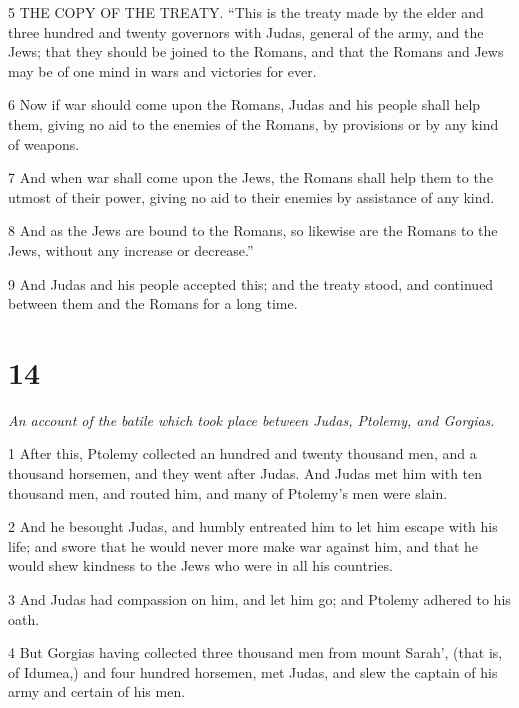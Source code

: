 \par 5 THE COPY OF THE TREATY. “This is the treaty made by the elder and three hundred and twenty governors with Judas, general of the army, and the Jews; that they should be joined to the Romans, and that the Romans and Jews may be of one mind in wars and victories for ever.

\par 6 Now if war should come upon the Romans, Judas and his people shall help them, giving no aid to the enemies of the Romans, by provisions or by any kind of weapons. 

\par 7 And when war shall come upon the Jews, the Romans shall help them to the utmost of their power, giving no aid to their enemies by assistance of any kind. 

\par 8 And as the Jews are bound to the Romans, so likewise are the Romans to the Jews, without any increase or decrease.” 

\par 9 And Judas and his people accepted this; and the treaty stood, and continued between them and the Romans for a long time. 

\chapter{14}

\par \textit{An account of the batile which took place between Judas, Ptolemy, and Gorgias.}

\par 1 After this, Ptolemy collected an hundred and twenty thousand men, and a thousand horsemen, and they went after Judas. And Judas met him with ten thousand men, and routed him, and many of Ptolemy’s men were slain. 

\par 2 And he besought Judas, and humbly entreated him to let him escape with his life; and swore that he would never more make war against him, and that he would shew kindness to the Jews who were in all his countries. 

\par 3 And Judas had compassion on him, and let him go; and Ptolemy adhered to his oath. 

\par 4 But Gorgias having collected three thousand men from mount Sarah’, (that is, of Idumea,) and four hundred horsemen, met Judas, and slew the captain of his army and certain of his men. 

